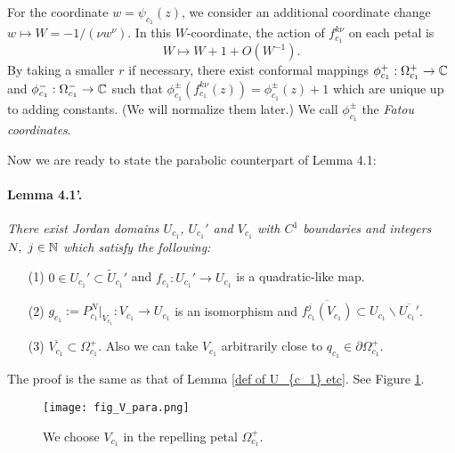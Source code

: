 For the coordinate $w=\psi_{c_1}(z)$, 
we consider an additional coordinate change 
$w \mapsto W=-1/(\nu w^\nu)$. In this $W$-coordinate,
the action of $f_{c_1}^{k\nu}$ on each petal is 
$$
W \mapsto W+1+ O(W^{-1}).
$$
By taking a smaller $r$ if necessary,
there exist 
conformal mappings 
$\phi_{c_1}^ + :\Omega_{c_1}^ +  \to \mathbb C$
and 
$\phi_{c_1}^-:\Omega_{c_1}^- \to \mathbb C$
such that $\phi_{c_1}^\pm (f_{c_1}^{k\nu}(z)) =\phi_{c_1}^\pm(z)+1$
which are unique up to adding constants.
(We will normalize them later.) 
We call $\phi_{c_1}^\pm$ the {\it Fatou coordinates}.


Now we are ready to state the parabolic counterpart of Lemma 4.1:

\vskip 2mm

\paragraph{\bf Lemma 4.1'.}
{\it
There exist Jordan domains $U_{c_1}$, $U_{c_1}'$ and $V_{c_1}$ with 
$C^1$ boundaries and 
integers $N, \ j \in \mathbb N$ which satisfy 
the following:
\begin{itemize}
\item[\rm (1)]
$0 \in U_{c_1}' \subset \widetilde{U}_{c_1}'$ and 
$f_{c_1}: U_{c_1}' \to U_{c_1}$ is a 
quadratic-like map.

\item[\rm (2)]
$g_{c_1} := P_{c_1}^N|_{V_{c_1}} : V_{c_1} \to U_{c_1}$ is an isomorphism
and $\overline{f_{c_1}^j(V_{c_1})} 
\subset U_{c_1} \smallsetminus \overline{U_{c_1}'}$.

\item[\rm (3)]
$\overline{V_{c_1}} \subset \Omega_{c_1}^+$. Also we can take $V_{c_1}$ arbitrarily
close to $q_{c_1} \in \partial \Omega_{c_1}^+$.
\end{itemize}
\label{def of U_{c_1} etc for parabolic case}
}

\vskip 2mm



\noin
The proof is the same as that of Lemma \ref{def of U_{c_1} etc}. 
See Figure \ref{fig_V_para}.


\begin{figure}[htbp]
\begin{center}
\texttt{[image: fig\_V\_para.png]}
\end{center}
\caption{\small We choose $V_{c_1}$ in the repelling petal $\Omega_{c_1}^+$.}
\label{fig_V_para}
\end{figure}




